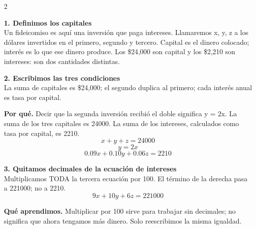 \documentclass[11pt,a4paper,landscape]{article}
\begin{document}
\begin{multicols*}{2}
\noindent\begin{minipage}{\linewidth}\textbf{1. Definimos los capitales}\\[2pt]Un fideicomiso es aquí una inversión que paga intereses. Llamaremos x, y, z a los dólares invertidos en el primero, segundo y tercero. Capital es el dinero colocado; interés es lo que ese dinero produce. Los \$24,000 son capital y los \$2,210 son intereses: son dos cantidades distintas.
\par{}\par\smallskip
\end{minipage}\par\medskip
\noindent\begin{minipage}{\linewidth}\textbf{2. Escribimos las tres condiciones}\\[2pt]La suma de capitales es \$24,000; el segundo duplica al primero; cada interés anual es tasa por capital.
\par\smallskip\textbf{Por qué.} Decir que la segunda inversión recibió el doble significa y = 2x. La suma de los tres capitales es 24000. La suma de los intereses, calculados como tasa por capital, es 2210.
\[x+y+z=24000\]
\[y=2x\]
\[0.09x+0.10y+0.06z=2210\]
\end{minipage}\par\medskip
\noindent\begin{minipage}{\linewidth}\textbf{3. Quitamos decimales de la ecuación de intereses}\\[2pt]Multiplicamos TODA la tercera ecuación por 100. El término de la derecha pasa a 221000; no a 2210.
\[9x+10y+6z=221000\]
\par\smallskip\textbf{Qué aprendimos.} Multiplicar por 100 sirve para trabajar sin decimales; no significa que ahora tengamos más dinero. Solo reescribimos la misma igualdad.

\end{minipage}
\end{multicols*}
\end{document}
